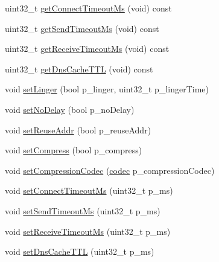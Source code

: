 \begin{DoxyCompactItemize}
\item 
uint32\+\_\+t \hyperlink{classxtd_1_1network_1_1utils_1_1Config_a2dfd5c85238ef930891d3696e6f6246c}{get\+Connect\+Timeout\+Ms} (void) const 
\item 
uint32\+\_\+t \hyperlink{classxtd_1_1network_1_1utils_1_1Config_a300d76106dcc338d662894dd04373d91}{get\+Send\+Timeout\+Ms} (void) const 
\item 
uint32\+\_\+t \hyperlink{classxtd_1_1network_1_1utils_1_1Config_a4484d8887f26682beb5aaa45f801dc57}{get\+Receive\+Timeout\+Ms} (void) const 
\item 
uint32\+\_\+t \hyperlink{classxtd_1_1network_1_1utils_1_1Config_a1ef6d7fcee95df86143dfbdd007f64f9}{get\+Dns\+Cache\+T\+TL} (void) const 
\item 
void \hyperlink{classxtd_1_1network_1_1utils_1_1Config_a1a0e52354981c89c5aaf2b31d4490de2}{set\+Linger} (bool p\+\_\+linger, uint32\+\_\+t p\+\_\+linger\+Time)
\item 
void \hyperlink{classxtd_1_1network_1_1utils_1_1Config_a1dbcee3c0f2631269ea3e716a62ce333}{set\+No\+Delay} (bool p\+\_\+no\+Delay)
\item 
void \hyperlink{classxtd_1_1network_1_1utils_1_1Config_a5e78cf9920484c88da5f42bae16b7a1f}{set\+Reuse\+Addr} (bool p\+\_\+reuse\+Addr)
\item 
void \hyperlink{classxtd_1_1network_1_1utils_1_1Config_aab76e2174465ead19cc97fa3f5a7f009}{set\+Compress} (bool p\+\_\+compress)
\item 
void \hyperlink{classxtd_1_1network_1_1utils_1_1Config_a604e4ade1c49d83d204024f28a3d461d}{set\+Compression\+Codec} (\hyperlink{namespacextd_1_1network_1_1utils_a3ac1216ad2037b366cc1f9051a978161}{codec} p\+\_\+compression\+Codec)
\item 
void \hyperlink{classxtd_1_1network_1_1utils_1_1Config_a5ecd1cd77dd3bd937aa021d3bf0ad860}{set\+Connect\+Timeout\+Ms} (uint32\+\_\+t p\+\_\+ms)
\item 
void \hyperlink{classxtd_1_1network_1_1utils_1_1Config_a583358bf6945cbddd657f6db8c31618e}{set\+Send\+Timeout\+Ms} (uint32\+\_\+t p\+\_\+ms)
\item 
void \hyperlink{classxtd_1_1network_1_1utils_1_1Config_ad633fb35c7202550d444e4bf5ae213df}{set\+Receive\+Timeout\+Ms} (uint32\+\_\+t p\+\_\+ms)
\item 
void \hyperlink{classxtd_1_1network_1_1utils_1_1Config_a9a2d3e9de6f26708a4bddc4ba7c31428}{set\+Dns\+Cache\+T\+TL} (uint32\+\_\+t p\+\_\+ms)
\end{DoxyCompactItemize}


